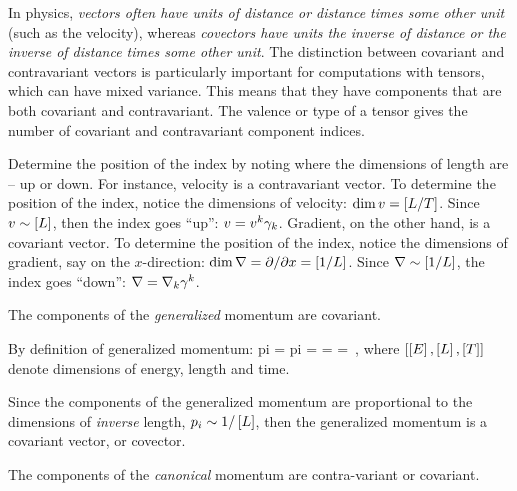 In physics, \emph{vectors often have units of distance or distance times some other unit} (such as the velocity), whereas \emph{covectors have units the inverse of distance or the inverse of distance times some other unit}. The distinction between covariant and contravariant vectors is particularly important for computations with tensors, which can have mixed variance. This means that they have components that are both covariant and contravariant. The valence or type of a tensor gives the number of covariant and contravariant component indices.

\begin{note}
Determine the position of the index by noting where the dimensions of length are -- up or down. For instance, velocity is a contravariant vector. To determine the position of the index, notice the dimensions of velocity: $\dim v = \left[{L/T}\right]$. Since $v\sim \left[{L}\right]$, then the index goes ``up'': $v = {v}^{k}\gamma_{k}$. Gradient, on the other hand, is a covariant vector. To determine the position of the index, notice the dimensions of gradient, say on the $x$-direction: $\dim \nabla = \partial/\partial x = \left[{1/L}\right]$. Since $\nabla\sim \left[{1/L}\right]$, the index goes ``down'': $\nabla = {\nabla}_{k}\gamma^{k}$.
\end{note}


\begin{example}
The components of the \emph{generalized} momentum are covariant.
\end{example}

\begin{solution}
By definition of generalized momentum:
\beq
\covec pi = \xpd{}\implies \dim\covec pi 
          = \dim \xpd{} 
          = 
          = \,,
\eeq
where $\left[{\left[{E}\right],\left[{L}\right],\left[{T}\right]}\right]$ denote dimensions of energy, length and time.

Since the components of the generalized momentum are proportional to the dimensions of \emph{inverse} length, ${p}_{i}\sim 1/\left[{L}\right]$, then the generalized momentum is a covariant vector, or covector.
\end{solution}

\begin{example}
The components of the \emph{canonical} momentum are contra-variant or covariant.
\end{example}

